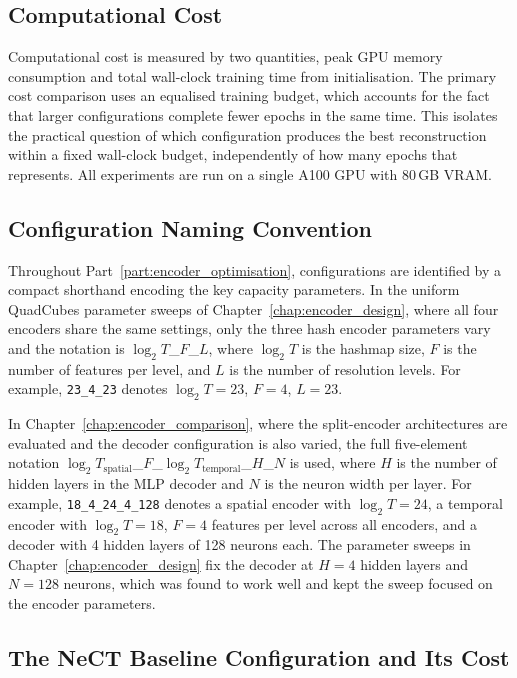 \documentclass[12pt, a4paper, twoside]{report}
\begin{document}
\subsection*{Computational Cost}

Computational cost is measured by two quantities, peak GPU memory consumption and total wall-clock training time from initialisation. The primary cost comparison uses an equalised training budget, which accounts for the fact that larger configurations complete fewer epochs in the same time. This isolates the practical question of which configuration produces the best reconstruction within a fixed wall-clock budget, independently of how many epochs that represents. All experiments are run on a single A100 GPU with 80\,GB VRAM.

\subsection*{Configuration Naming Convention}

Throughout Part~\ref{part:encoder_optimisation}, configurations are identified by a compact shorthand encoding the key capacity parameters. In the uniform QuadCubes parameter sweeps of Chapter~\ref{chap:encoder_design}, where all four encoders share the same settings, only the three hash encoder parameters vary and the notation is $\log_2 T$\_$F$\_$L$, where $\log_2 T$ is the hashmap size, $F$ is the number of features per level, and $L$ is the number of resolution levels. For example, \texttt{23\_4\_23} denotes $\log_2 T = 23$, $F = 4$, $L = 23$.

In Chapter~\ref{chap:encoder_comparison}, where the split-encoder architectures are evaluated and the decoder configuration is also varied, the full five-element notation $\log_2 T_\text{spatial}$\_$F$\_$\log_2 T_\text{temporal}$\_$H$\_$N$ is used, where $H$ is the number of hidden layers in the MLP decoder and $N$ is the neuron width per layer. For example, \texttt{18\_4\_24\_4\_128} denotes a spatial encoder with $\log_2 T = 24$, a temporal encoder with $\log_2 T = 18$, $F = 4$ features per level across all encoders, and a decoder with 4 hidden layers of 128 neurons each. The parameter sweeps in Chapter~\ref{chap:encoder_design} fix the decoder at $H = 4$ hidden layers and $N = 128$ neurons, which was found to work well and kept the sweep focused on the encoder parameters.

\subsection*{The NeCT Baseline Configuration and Its Cost}
\label{subsec:enc_baseline}
\end{document}
